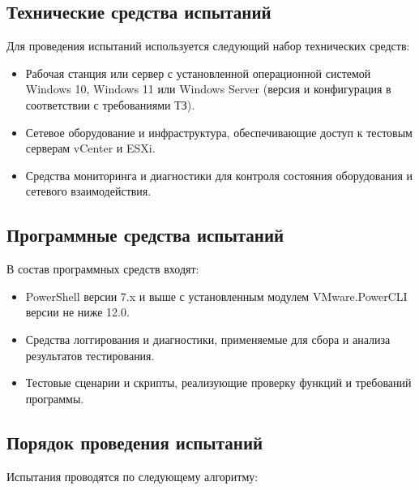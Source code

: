 \subsection{Технические средства испытаний}

Для проведения испытаний используется следующий набор технических средств:

\begin{itemize}
    \item Рабочая станция или сервер с установленной операционной системой Windows 10, Windows 11 или Windows Server (версия и конфигурация в соответствии с требованиями ТЗ).
    \item Сетевое оборудование и инфраструктура, обеспечивающие доступ к тестовым серверам vCenter и ESXi.
    \item Средства мониторинга и диагностики для контроля состояния оборудования и сетевого взаимодействия.
\end{itemize}

\subsection{Программные средства испытаний}

В состав программных средств входят:

\begin{itemize}
    \item PowerShell версии 7.x и выше с установленным модулем VMware.PowerCLI версии не ниже 12.0.
    \item Средства логгирования и диагностики, применяемые для сбора и анализа результатов тестирования.
    \item Тестовые сценарии и скрипты, реализующие проверку функций и требований программы.
\end{itemize}

\subsection{Порядок проведения испытаний}

Испытания проводятся по следующему алгоритму:

